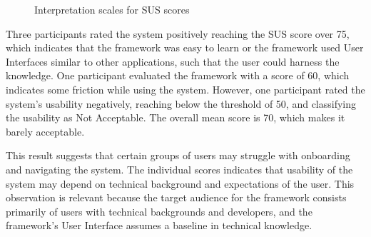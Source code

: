 \begin{figure}[h]
    \centering

    \caption{Interpretation scales for SUS scores}
    \label{fig:sus-scales}
\end{figure}

Three participants rated the system positively reaching the SUS score over 75, which indicates that the framework was easy
to learn or the framework used User Interfaces similar to other applications, such that the user could harness the knowledge.
One participant evaluated the framework with a score of 60, which indicates some friction while using the system.
However, one participant rated the system's usability negatively, reaching below the threshold of 50,
and classifying the usability as Not Acceptable.
The overall mean score is 70, which makes it barely acceptable.

This result suggests that certain groups of users may struggle with onboarding and navigating the system.
The individual scores indicates that usability of the system may depend on technical background and expectations of the user.
This observation is relevant because the target audience for the framework consists primarily
of users with technical backgrounds and developers,
and the framework's User Interface assumes a baseline in technical knowledge.

